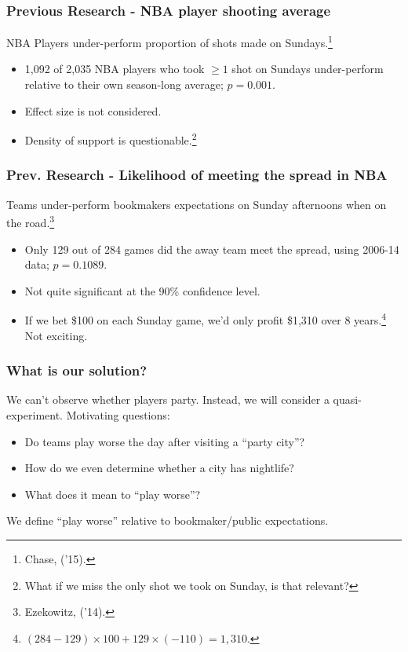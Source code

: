 \documentclass{beamer}
\begin{document}
\begin{frame}
  \frametitle{Previous Research - NBA player shooting average}     
  NBA Players under-perform proportion of shots made on Sundays.\footnote{Chase, ('15).}
    \begin{itemize}       
    \item 1,092 of 2,035 NBA players who took $\geq 1$ shot on Sundays under-perform 
      relative to their own season-long average; $p=0.001$.
      \item Effect size is not considered.
      \item Density of support is questionable.\footnote{What if we miss the only shot we took on Sunday, is that relevant?}     \end{itemize}
\end{frame}

\begin{frame}   \frametitle{Prev. Research - Likelihood of meeting the spread in NBA}
  Teams under-perform bookmakers expectations on Sunday afternoons when on the road.\footnote{Ezekowitz, ('14).}
\vspace{12pt}
    \begin{itemize}       
    \item Only 129 out of 284 games did the away team meet the spread, 
      using 2006-14 data; $p=0.1089$.
    \item Not quite significant at the 90\% confidence level.     
    \item If we bet \$100 on each Sunday game, we'd only profit \$1,310 over 8 years.\footnote{$(284 - 129) \times 100 + 129 \times (-110) = 1,310$.} Not exciting.
    \end{itemize}
  \end{frame}

\begin{frame}   
  \frametitle{What is our solution?}
  \begin{block}{We can't observe whether players party.}
    Instead, we will consider a quasi-experiment. Motivating questions:
    \begin{itemize}       \item Do teams play worse the day after visiting a ``party city''?
      \item How do we even determine whether a city has nightlife?    
      \item What does it mean to ``play worse''? \end{itemize}
  \end{block}

  \vspace{12pt}We define ``play worse'' relative to bookmaker/public expectations.
\end{frame}
\end{document}
